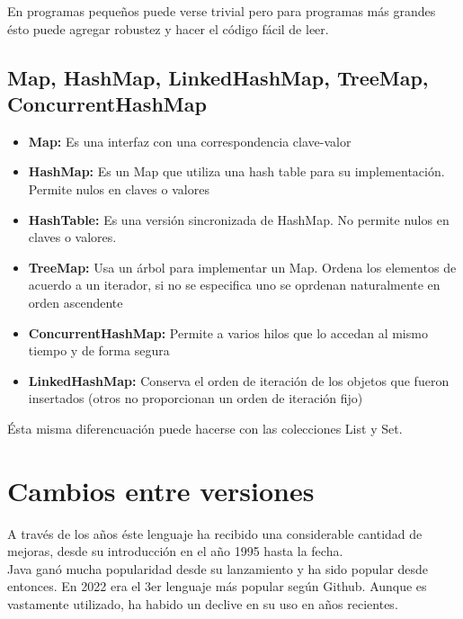 \documentclass[12pt,article,oneside]{memoir}
\begin{document}
		En programas peque\~nos puede verse trivial pero para programas m\'as grandes \'esto puede agregar robustez y hacer 
		el c\'odigo f\'acil de leer.
		
		\section{Map, HashMap, LinkedHashMap, TreeMap, ConcurrentHashMap}
		
			\begin{itemize}
				\item \textbf{Map:} Es una interfaz con una correspondencia clave-valor

				\item \textbf{HashMap:} Es un Map que utiliza una hash table para su implementación. Permite nulos en claves 
				o valores
				
				\item \textbf{HashTable:} Es una versión sincronizada de HashMap. No permite nulos en claves o valores.
				
				\item \textbf{TreeMap:} Usa un árbol para implementar un Map. Ordena los elementos de acuerdo a un iterador, 
				si no se especifica uno se oprdenan naturalmente en orden ascendente
				
				\item \textbf{ConcurrentHashMap:} Permite a varios hilos que lo accedan al mismo tiempo y de forma segura
				
				\item \textbf{LinkedHashMap:} Conserva el orden de iteración de los objetos que fueron insertados (otros no 
				proporcionan un orden de iteración fijo)
			\end{itemize}
			
			\'Esta misma diferencuaci\'on puede hacerse con las colecciones List y Set. 
		
	\chapter{Cambios entre versiones}
	A trav\'es de los a\~nos \'este lenguaje ha recibido una considerable cantidad de mejoras, desde su introducci\'on en 
	el a\~no 1995 hasta la fecha.\\
	
	Java gan\'o mucha popularidad desde su lanzamiento y ha sido popular desde entonces. En 2022 era el 3er lenguaje 
	m\'as popular seg\'un Github. Aunque es vastamente utilizado, ha habido un declive en su uso en a\~nos recientes.\\
	
\end{document}
